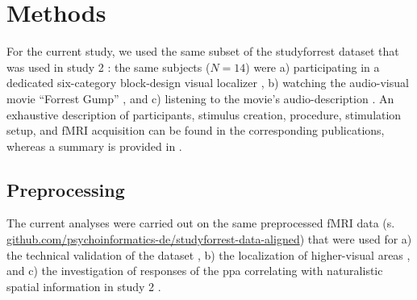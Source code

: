 \section{Methods}


For the current study, we used the same subset of the studyforrest dataset that
was used in study 2 \citep{haeusler2022processing}:
%
the same subjects ($N=14$) were
a) participating in a dedicated six-category block-design visual localizer
\citep{sengupta2016extension},
b) watching the audio-visual movie ``Forrest Gump''
\citep{hanke2016simultaneous}, and
c) listening to the movie's audio-description \citep{hanke2014audiomovie}.
An exhaustive description of participants, stimulus creation, procedure,
stimulation setup, and fMRI acquisition can be found in the corresponding
publications, whereas a summary is provided in \citet{haeusler2022processing}.




\subsection{Preprocessing}

The current analyses were carried out on the same preprocessed fMRI data (s.
\href{https://github.com/psychoinformatics-de/studyforrest-data-aligned
}{\url{github.com/psychoinformatics-de/studyforrest-data-aligned}}) that were
used for
%
a) the technical validation of the dataset \citep{hanke2016simultaneous},
%
b) the localization of higher-visual areas \citep{sengupta2016extension}, and
%
c) the investigation of responses of the \ac{ppa} correlating with naturalistic
spatial information in study 2 \citep{haeusler2022processing}.

